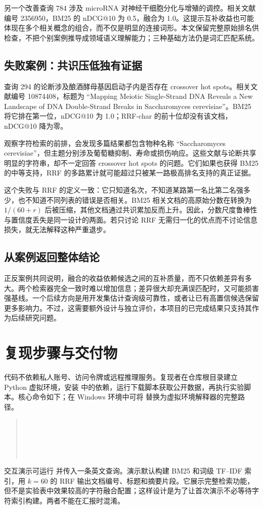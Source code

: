 \documentclass[sigconf,nonacm]{acmart}
\begin{document}
另一个改善查询 784 涉及 microRNA 对神经干细胞分化与增殖的调控。相关文献编号 2356950，BM25 的 nDCG@10 为 0.5，融合为 1.0。这提示互补收益也可能体现在多个相关概念的组合，而不仅是明显的连接词形。本文保留完整原始排名供检查，不把个别案例推导成领域语义理解能力；三种基础方法仍是词汇匹配系统。

\subsection{失败案例：共识压低独有证据}
查询 294 的论断涉及酿酒酵母基因启动子内是否存在 crossover hot spots。相关文献编号 10874408，标题为 ``Mapping Meiotic Single-Strand DNA Reveals a New Landscape of DNA Double-Strand Breaks in Saccharomyces cerevisiae''。BM25 将它排在第一位，nDCG@10 为 1.0；RRF-char 的前十位却没有该文档，nDCG@10 降为零。

观察字符检索的前排，会发现多篇结果都包含物种名称 ``Saccharomyces cerevisiae''，但主题分别涉及葡萄糖抑制、寿命或损伤响应。这些文献与论断共享明显的字符串，却不一定回答 crossover hot spots 的问题。它们如果也获得 BM25 的中等支持，RRF 的多路累计就可能超过只被某一路极高排名支持的真正证据。

这个失败与 RRF 的定义一致：它只知道名次，不知道某路第一名比第二名强多少，也不知道不同列表的错误是否相关。BM25 相关文档的高原始分数在转换为 $1/(60+r)$ 后被压缩，其他文档通过共识累加反而上升。因此，分数尺度鲁棒性与置信度丢失是同一设计的两面。若只讨论 RRF 无需归一化的优点而不讨论信息损失，就无法解释这种严重退步。

\subsection{从案例返回整体结论}
正反案例共同说明，融合的收益依赖候选之间的互补质量，而不只依赖差异有多大。两个检索器完全一致时难以增加信息；差异很大却充满误匹配时，又可能损害强基线。一个后续方向是用开发集估计查询级可靠性，或者让已有高置信候选保留更多影响力。不过，这需要额外设计与独立评价，本项目的已完成结果只支持其作为后续研究问题。

\section{复现步骤与交付物}
代码不依赖私人账号、访问令牌或远程推理服务。复现者在仓库根目录建立 Python 虚拟环境，安装  中的依赖，运行下载脚本获取公开数据，再执行实验脚本。核心命令如下；在 Windows 环境中可将  替换为虚拟环境解释器的完整路径。
\begin{quote}\small
{}\\
\\
\\
\\
\end{quote}
交互演示可运行  并传入一条英文查询。演示默认构建 BM25 和词级 TF--IDF 索引，用 $k=60$ 的 RRF 输出文档编号、标题和摘要片段。它展示完整检索功能，但不是实验表中效果较高的字符融合配置；这样设计是为了让首次演示不必等待字符索引构建。两者不能在汇报时混淆。
\end{document}
